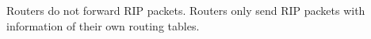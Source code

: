 Routers do not forward RIP packets. Routers only send RIP packets with information of their own routing tables.